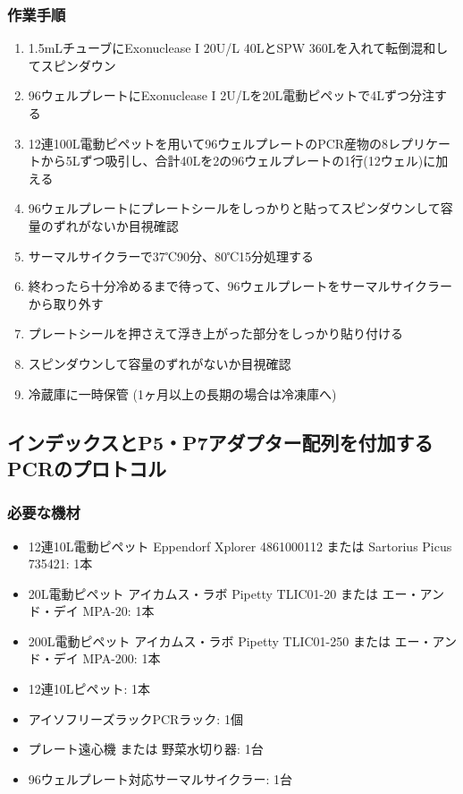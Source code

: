 \documentclass[titlepage,10pt,a4paper,uplatex]{jsbook}
\begin{document}
\subsubsection{作業手順}
\begin{enumerate}
\item 1.5mLチューブにExonuclease I 20U/{\textmu}L 40{\textmu}LとSPW 360{\textmu}Lを入れて転倒混和してスピンダウン
\item 96ウェルプレートにExonuclease I 2U/{\textmu}Lを20{\textmu}L電動ピペットで4{\textmu}Lずつ分注する
\item 12連100{\textmu}L電動ピペットを用いて96ウェルプレートのPCR産物の8レプリケートから5{\textmu}Lずつ吸引し、合計40{\textmu}Lを2の96ウェルプレートの1行(12ウェル)に加える
\item 96ウェルプレートにプレートシールをしっかりと貼ってスピンダウンして容量のずれがないか目視確認
\item サーマルサイクラーで37℃90分、80℃15分処理する
\item 終わったら十分冷めるまで待って、96ウェルプレートをサーマルサイクラーから取り外す
\item プレートシールを押さえて浮き上がった部分をしっかり貼り付ける
\item スピンダウンして容量のずれがないか目視確認
\item 冷蔵庫に一時保管 (1ヶ月以上の長期の場合は冷凍庫へ)
\end{enumerate}

\subsection{インデックスとP5・P7アダプター配列を付加するPCRのプロトコル}

\subsubsection{必要な機材}
\begin{itemize}
\item 12連10{\textmu}L電動ピペット Eppendorf Xplorer 4861000112 または Sartorius Picus 735421: 1本
\item 20{\textmu}L電動ピペット アイカムス・ラボ Pipetty TLIC01-20 または エー・アンド・デイ MPA-20: 1本
\item 200{\textmu}L電動ピペット アイカムス・ラボ Pipetty TLIC01-250 または エー・アンド・デイ MPA-200: 1本
\item 12連10{\textmu}Lピペット: 1本
\item アイソフリーズラックPCRラック: 1個
\item プレート遠心機 または 野菜水切り器: 1台
\item 96ウェルプレート対応サーマルサイクラー: 1台
\end{itemize}
\end{document}
